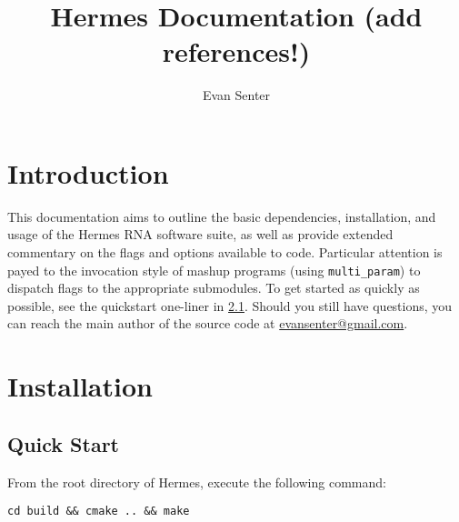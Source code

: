 \documentclass[11pt]{article}
\begin{document}
\newcommand{
\sectionLabel}[2] {
\section{#1} \label{sec:#2} }
\newcommand{
\subsectionLabel}[2] {
\subsection{#1} \label{sub:#2} }
\newcommand{\fixedWidthInList}[4] {
\item[\texttt{#1} \textnormal{#2} \url{#3}] \hfill \\
#4 }
\newcommand{\optionListItem}[2] {\item[\optionFlag{#1}] #2}
\newcommand{\optionFlag}[1] {\ttt{-#1/-\MakeUppercase{#1}}}
\newcommand{\ttt}[1]{{\tt #1}\xspace}
\newcommand{\hermes}{\ttt{hermes}}
\newcommand{\multiParam}{\ttt{multi\_param}}
\newcommand{\fft}{\ttt{FFTbor2D}}
\newcommand{\rnamfpt}{\ttt{RNAmfpt}}
\newcommand{\rnaeq}{\ttt{RNAeq}}
\newcommand{\fftmfpt}{\ttt{FFTmfpt}}
\newcommand{\ffteq}{\ttt{FFTeq}}
\newcommand{\rateeq}{\ttt{RateEq}}
\newcommand{\s}{$s$\xspace}
\newcommand{\A}{$A$\xspace}
\newcommand{\B}{$B$\xspace}

\title{Hermes Documentation (add references!)}
\author{Evan Senter}

\maketitle
\tableofcontents \clearpage

\sectionLabel{Introduction}{intro}

This documentation aims to outline the basic dependencies, installation, and usage of the Hermes RNA software suite, as well as provide extended commentary on the flags and options available to code. Particular attention is payed to the invocation style of mashup programs (using \multiParam) to dispatch flags to the appropriate submodules. To get started as quickly as possible, see the quickstart one-liner in \ref{sub:quickstart}. Should you still have questions, you can reach the main author of the source code at \href{mailto:evansenter@gmail.com}{evansenter@gmail.com}.

\sectionLabel{Installation}{install}

\subsectionLabel{Quick Start}{quickstart}

From the root directory of Hermes, execute the following command:

{\tt cd build \&\& cmake .. \&\& make}
\end{document}
